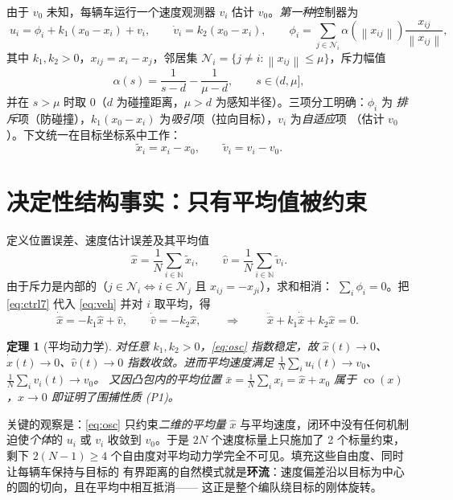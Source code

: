 \documentclass[11pt,a4paper]{ctexart}
\theoremstyle{plain}
\newtheorem{theorem}{定理}
\theoremstyle{definition}
\theoremstyle{remark}
\newcommand{\NN}{\mathbb{N}}
\newcommand{\calN}{\mathcal{N}}
\newcommand{\bx}{\widehat{x}}
\newcommand{\bv}{\widehat{v}}
\newcommand{\txi}{\tilde{x}}
\newcommand{\tv}{\tilde{v}}
\newcommand{\norm}[1]{\left\|#1\right\|}
\DeclareMathOperator{\co}{co}
\begin{document}
由于 $v_0$ 未知，每辆车运行一个速度观测器 $v_i$ 估计 $v_0$。\emph{第一种}控制器为
\begin{equation}
  \boxed{\;
  u_i=\phi_i+k_1(x_0-x_i)+v_i,\qquad
  \dot v_i=k_2(x_0-x_i),\qquad
  \phi_i=\sum_{j\in\calN_i}\alpha(\norm{x_{ij}})\frac{x_{ij}}{\norm{x_{ij}}},\;}
  \label{eq:ctrl7}
\end{equation}
其中 $k_1,k_2>0$，$x_{ij}=x_i-x_j$，邻居集 $\calN_i=\{j\ne i:\norm{x_{ij}}\le\mu\}$，斥力幅值
\begin{equation}
  \alpha(s)=\frac{1}{s-d}-\frac{1}{\mu-d},\qquad s\in(d,\mu],
  \label{eq:alpha}
\end{equation}
并在 $s>\mu$ 时取 $0$（$d$ 为碰撞距离，$\mu>d$ 为感知半径）。三项分工明确：$\phi_i$ 为
\emph{排斥}项（防碰撞），$k_1(x_0-x_i)$ 为\emph{吸引}项（拉向目标），$v_i$ 为\emph{自适应}项
（估计 $v_0$）。下文统一在目标坐标系中工作：
\begin{equation}
  \txi_i=x_i-x_0,\qquad \tv_i=v_i-v_0 .
  \label{eq:rel}
\end{equation}

\section{决定性结构事实：只有平均值被约束}
\label{sec:avg}

定义位置误差、速度估计误差及其平均值
\begin{equation}
  \bx=\frac1N\sum_{i\in\NN}\txi_i,\qquad
  \bv=\frac1N\sum_{i\in\NN}\tv_i .
\end{equation}
由于斥力是内部的（$j\in\calN_i\Leftrightarrow i\in\calN_j$ 且 $x_{ij}=-x_{ji}$），求和相消：
$\sum_i\phi_i=0$。把 \eqref{eq:ctrl7} 代入 \eqref{eq:veh} 并对 $i$ 取平均，得
\begin{equation}
  \dot\bx=-k_1\bx+\bv,\qquad \dot\bv=-k_2\bx,
  \qquad\Longrightarrow\qquad
  \boxed{\;\ddot\bx+k_1\dot\bx+k_2\bx=0.\;}
  \label{eq:osc}
\end{equation}

\begin{theorem}[平均动力学]
\label{thm:avg}
对任意 $k_1,k_2>0$，\eqref{eq:osc} 指数稳定，故 $\bx(t)\to0$、$\dot\bx(t)\to0$、$\bv(t)\to0$
指数收敛。进而平均速度满足 $\frac1N\sum_iu_i(t)\to v_0$、$\frac1N\sum_iv_i(t)\to v_0$。
又因凸包内的平均位置 $\bar x=\frac1N\sum_ix_i=\bx+x_0$ 属于 $\co(x)$，$\bx\to0$ 即证明了围捕性质
(P1)。
\end{theorem}

关键的观察是：\eqref{eq:osc} 只约束\emph{二维的平均量} $\bx$ 与平均速度，闭环中没有任何机制
迫使\emph{个体}的 $u_i$ 或 $v_i$ 收敛到 $v_0$。于是 $2N$ 个速度标量上只施加了 2 个标量约束，
剩下 $2(N-1)\ge4$ 个自由度对平均动力学完全不可见。填充这些自由度、同时让每辆车保持与目标的
有界距离的自然模式就是\textbf{环流}：速度偏差沿以目标为中心的圆的切向，且在平均中相互抵消——
这正是整个编队绕目标的刚体旋转。
\end{document}
